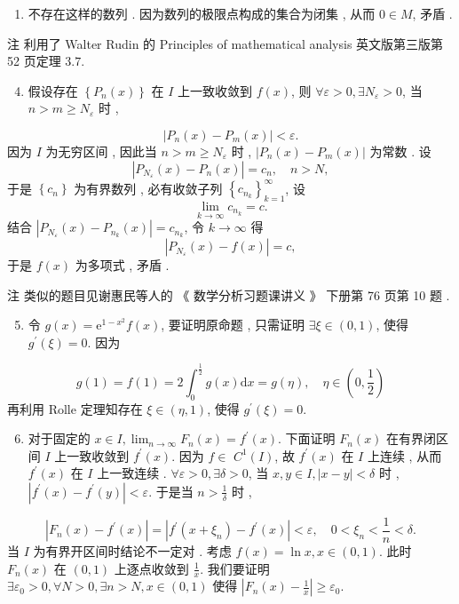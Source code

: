 \documentclass[10pt]{article}
\begin{document}
\begin{enumerate}
  \item  不存在这样的数列 .  因为数列的极限点构成的集合为闭集 ,  从而  $0 \in M$,  矛盾 .

\end{enumerate}
 注   利用了  Walter Rudin  的  Principles of mathematical analysis  英文版第三版第  52  页定理  $3.7$.

\begin{enumerate}
  \setcounter{enumi}{3}
  \item  假设存在  $\left\{P_{n}(x)\right\}$  在  $I$  上一致收敛到  $f(x)$,  则  $\forall \varepsilon>0, \exists N_{\varepsilon}>0$,  当  $n>m \geqslant N_{\varepsilon}$  时 ,
\end{enumerate}
$$
\left|P_{n}(x)-P_{m}(x)\right|<\varepsilon .
$$
 因为  $I$  为无穷区间 ,  因此当  $n>m \geqslant N_{\varepsilon}$  时 , $\left|P_{n}(x)-P_{m}(x)\right|$  为常数 .  设 
$$
\left|P_{N_{\varepsilon}}(x)-P_{n}(x)\right|=c_{n}, \quad n>N,
$$
 于是  $\left\{c_{n}\right\}$  为有界数列 ,  必有收敛子列  $\left\{c_{n_{k}}\right\}_{k=1}^{\infty}$,  设 
$$
\lim _{k \rightarrow \infty} c_{n_{k}}=c .
$$
 结合  $\left|P_{N_{\varepsilon}}(x)-P_{n_{k}}(x)\right|=c_{n_{k}}$,  令  $k \rightarrow \infty$  得 
$$
\left|P_{N_{\varepsilon}}(x)-f(x)\right|=c,
$$
 于是  $f(x)$  为多项式 ,  矛盾 .

 注   类似的题目见谢惠民等人的 《 数学分析习题课讲义 》 下册第  76  页第  10  题 .

\begin{enumerate}
  \setcounter{enumi}{4}
  \item  令  $g(x)=\mathrm{e}^{1-x^{2}} f(x)$,  要证明原命题 ,  只需证明  $\exists \xi \in(0,1)$,  使得  $g^{\prime}(\xi)=0$.  因为 
\end{enumerate}
$$
g(1)=f(1)=2 \int_{0}^{\frac{1}{2}} g(x) \mathrm{d} x=g(\eta), \quad \eta \in\left(0, \frac{1}{2}\right)
$$
 再利用  Rolle  定理知存在  $\xi \in(\eta, 1)$,  使得  $g^{\prime}(\xi)=0$.

\begin{enumerate}
  \setcounter{enumi}{5}
  \item  对于固定的  $x \in I, \lim _{n \rightarrow \infty} F_{n}(x)=f^{\prime}(x)$.  下面证明  $F_{n}(x)$  在有界闭区间  $I$  上一致收敛到  $f^{\prime}(x)$.  因为  $f \in$ $C^{1}(I)$,  故  $f^{\prime}(x)$  在  $I$  上连续 ,  从而  $f^{\prime}(x)$  在  $I$  上一致连续 . $\forall \varepsilon>0, \exists \delta>0$,  当  $x, y \in I,|x-y|<\delta$  时 , $\left|f^{\prime}(x)-f^{\prime}(y)\right|<\varepsilon$.  于是当  $n>\frac{1}{\delta}$  时 ,
\end{enumerate}
$$
\left|F_{n}(x)-f^{\prime}(x)\right|=\left|f^{\prime}\left(x+\xi_{n}\right)-f^{\prime}(x)\right|<\varepsilon, \quad 0<\xi_{n}<\frac{1}{n}<\delta .
$$
 当  $I$  为有界开区间时结论不一定对 .  考虑  $f(x)=\ln x, x \in(0,1)$.  此时  $F_{n}(x)$  在  $(0,1)$  上逐点收敛到  $\frac{1}{x}$.  我们要证明  $\exists \varepsilon_{0}>0, \forall N>0, \exists n>N, x \in(0,1)$  使得  $\left|F_{n}(x)-\frac{1}{x}\right| \geqslant \varepsilon_{0}$.
\end{document}
